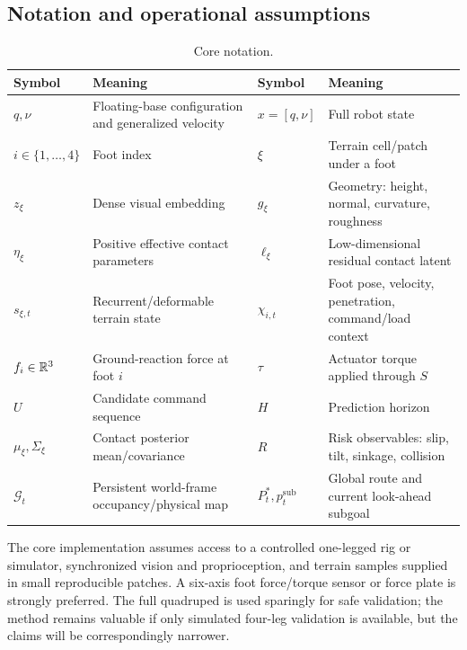 \subsection{Notation and operational assumptions}

\begin{table}[ht]
\centering
\caption{Core notation.}
\label{tab:notation}
\small
\begin{tabularx}{\textwidth}{@{}L{20mm}Y L{22mm}Y@{}}
\toprule
\textbf{Symbol} & \textbf{Meaning} & \textbf{Symbol} & \textbf{Meaning}\\
\midrule
$q,\nu$ & Floating-base configuration and generalized velocity & $x=[q,\nu]$ & Full robot state\\
$i\in\{1,\ldots,4\}$ & Foot index & $\xi$ & Terrain cell/patch under a foot\\
$z_\xi$ & Dense visual embedding & $g_\xi$ & Geometry: height, normal, curvature, roughness\\
$\eta_\xi$ & Positive effective contact parameters & $\ell_\xi$ & Low-dimensional residual contact latent\\
$s_{\xi,t}$ & Recurrent/deformable terrain state & $\chi_{i,t}$ & Foot pose, velocity, penetration, command/load context\\
$f_i\in\mathbb{R}^3$ & Ground-reaction force at foot $i$ & $\tau$ & Actuator torque applied through $S$\\
$U$ & Candidate command sequence & $H$ & Prediction horizon\\
$\mu_\xi,\Sigma_\xi$ & Contact posterior mean/covariance & $R$ & Risk observables: slip, tilt, sinkage, collision\\
$\mathcal G_t$ & Persistent world-frame occupancy/physical map & $P_t^*,p_t^{\mathrm{sub}}$ & Global route and current look-ahead subgoal\\
\bottomrule
\end{tabularx}
\end{table}

The core implementation assumes access to a controlled one-legged rig or simulator, synchronized vision and proprioception, and terrain samples supplied in small reproducible patches. A six-axis foot force/torque sensor or force plate is strongly preferred. The full quadruped is used sparingly for safe validation; the method remains valuable if only simulated four-leg validation is available, but the claims will be correspondingly narrower.
